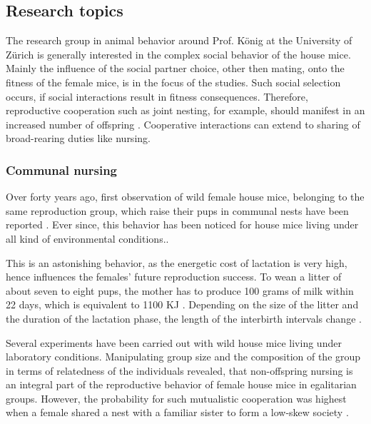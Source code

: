 \subsection{Research topics}
\label{subsec:researchtopics}

The research group in animal behavior around Prof. K\"onig at the University of Z\"urich is generally interested in the complex social behavior of the house mice. Mainly the influence of the social partner choice, other then mating, onto the fitness of the female mice, is in the focus of the studies. Such social selection occurs, if social interactions result in fitness consequences. Therefore, reproductive cooperation such as joint nesting, for example, should manifest in an increased number of offspring \cite{weidt:07}. Cooperative interactions can extend to sharing of broad-rearing duties like nursing.

\subsubsection{Communal nursing}
\label{subsubsec:comnurs}

Over forty years ago, first observation of wild female house mice, belonging to the same reproduction group, which raise their pups in communal nests have been reported \cite{southwick:55}. Ever since, this behavior has been noticed for house mice living under all kind of environmental conditions.\cite{crowcroft:63, sayler:69, gandelman:70, werboff:70, baker:81}.

This is an astonishing behavior, as the energetic cost of lactation is very high, hence influences the females' future reproduction success. To wean a litter of about seven to eight pups, the mother has to produce 100 grams of milk within 22 days, which is equivalent to 1100 \acf{KJ} \cite{koenig:88}. Depending on the size of the litter and the duration of the lactation phase, the length of the interbirth intervals change \cite{fuchs:81, fuchs:82, koenig:87a, koenig:87b}.

Several experiments have been carried out with wild house mice living under laboratory conditions. Manipulating group size and the composition of the group in terms of relatedness of the individuals revealed, that non-offspring nursing is an integral part of the reproductive behavior of female house mice in egalitarian groups. However, the probability for such mutualistic cooperation was highest when a female shared a nest with a familiar sister to form a low-skew society \cite{koenig:06}.

